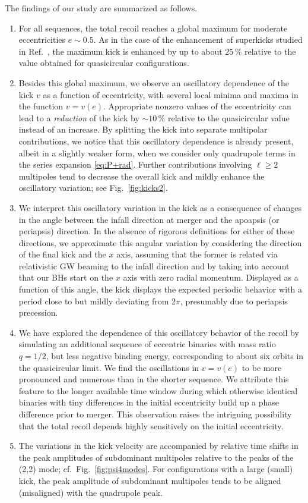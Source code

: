 \documentclass[floats,floatfix,showpacs,amssymb,physrev,twocolumn,superscriptaddress,reprint,
nofootinbib, longbibliography]{revtex4-2}
\newcounter{count}
\begin{document}
The findings of our study are summarized as follows.
%
\begin{enumerate}[label=(\roman*)]
 \item For all sequences, the total recoil reaches
 a global maximum for moderate eccentricities $e \sim 0.5$.
 As in the case of the enhancement of superkicks studied
 in Ref.~\cite{Sperhake:2019wwo}, the maximum kick is
 enhanced by up to about $25\,\%$ relative to the value obtained
 for quasicircular configurations.
\item Besides this global maximum, we observe an oscillatory
  dependence of the kick $v$ as a function of eccentricity, with
  several local minima and maxima in the function $v = v(e)$. Appropriate
  nonzero values of the eccentricity can lead to a
  {\it reduction} of the kick by $\sim 10\,\%$ relative to the quasicircular
  value instead of an increase. By
  splitting the kick into separate multipolar contributions, we notice
  that this oscillatory dependence is already present, albeit in a
  slightly weaker form, when we consider only quadrupole terms in the
  series expansion \eqref{eq:P+rad}.  Further contributions involving
  $\ell \ge 2$ multipoles tend to decrease the overall kick and mildly
  enhance the oscillatory variation; see Fig.~\ref{fig:kicks2}.
 \item We interpret this oscillatory variation in the kick
 as a consequence of changes in the angle between the infall
 direction at merger and the apoapsis (or periapsis)
 direction. In the absence of rigorous definitions for either
 of these directions, we approximate this angular variation
 by considering the direction of the final kick and the
 $x$ axis, assuming that the former is related via relativistic
 GW beaming to the infall direction and by taking into account
 that our BHs start on the $x$ axis with zero radial momentum.
 Displayed as a function of this angle, the kick displays
 the expected periodic behavior with a period close to but
 mildly deviating from $2\pi$, presumably due to periapsis
 precession.
 \item We have explored the dependence of this oscillatory behavior
 of the recoil by simulating an additional sequence of eccentric
 binaries with mass ratio $q=1/2$, but less negative binding energy,
 corresponding to about six orbits in the quasicircular limit.
 We find the oscillations in $v=v(e)$ to be more pronounced
 and numerous than in the shorter sequence. We attribute this
 feature to the longer available time window during which otherwise
 identical binaries with tiny differences in the initial
 eccentricity build up a phase difference prior to merger.
 This observation raises the intriguing possibility that the
 total recoil depends highly sensitively on the initial eccentricity.
 \item The variations in the kick velocity are accompanied by
 relative time shifts in the peak amplitudes of subdominant
 multipoles relative to the peaks of the (2,2) mode;
 cf.~Fig.~\ref{fig:psi4modes}. For configurations with a large (small)
 kick, the peak amplitude of subdominant multipoles tends to
 be aligned (misaligned) with the quadrupole peak.
\end{enumerate}
\end{document}
